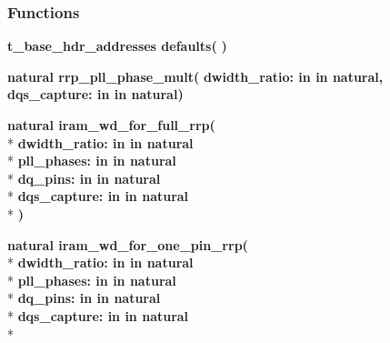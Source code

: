 \subsubsection*{Functions}
 \begin{DoxyCompactItemize}
\item 
{\bfseries {\bfseries {\bfseries {\bf t\+\_\+base\+\_\+hdr\+\_\+addresses}} \textcolor{vhdlchar}{ }}} {\bf defaults}{\bfseries  ( }{\bfseries  )} 
\item 
{\bfseries {\bfseries \textcolor{comment}{natural}\textcolor{vhdlchar}{ }}} {\bf rrp\+\_\+pll\+\_\+phase\+\_\+mult}{\bfseries  ( }{\bfseries \textcolor{vhdlchar}{dwidth\+\_\+ratio\+: }\textcolor{stringliteral}{in }\textcolor{vhdlchar}{in natural}}{\bfseries  , \textcolor{vhdlchar}{dqs\+\_\+capture\+: }\textcolor{stringliteral}{in }\textcolor{vhdlchar}{in natural}}{\bfseries  )} 
\item 
{\bfseries {\bfseries \textcolor{comment}{natural}\textcolor{vhdlchar}{ }}} {\bf iram\+\_\+wd\+\_\+for\+\_\+full\+\_\+rrp}{\bfseries  ( }\\*
{\bfseries \textcolor{vhdlchar}{dwidth\+\_\+ratio\+: }\textcolor{stringliteral}{in }\textcolor{vhdlchar}{in natural}}\\*
{\bfseries \textcolor{vhdlchar}{pll\+\_\+phases\+: }\textcolor{stringliteral}{in }\textcolor{vhdlchar}{in natural}}\\*
{\bfseries \textcolor{vhdlchar}{dq\+\_\+pins\+: }\textcolor{stringliteral}{in }\textcolor{vhdlchar}{in natural}}\\*
{\bfseries \textcolor{vhdlchar}{dqs\+\_\+capture\+: }\textcolor{stringliteral}{in }\textcolor{vhdlchar}{in natural}}\\*
{\bfseries  )} 
\item 
{\bfseries {\bfseries \textcolor{comment}{natural}\textcolor{vhdlchar}{ }}} {\bf iram\+\_\+wd\+\_\+for\+\_\+one\+\_\+pin\+\_\+rrp}{\bfseries  ( }\\*
{\bfseries \textcolor{vhdlchar}{dwidth\+\_\+ratio\+: }\textcolor{stringliteral}{in }\textcolor{vhdlchar}{in natural}}\\*
{\bfseries \textcolor{vhdlchar}{pll\+\_\+phases\+: }\textcolor{stringliteral}{in }\textcolor{vhdlchar}{in natural}}\\*
{\bfseries \textcolor{vhdlchar}{dq\+\_\+pins\+: }\textcolor{stringliteral}{in }\textcolor{vhdlchar}{in natural}}\\*
{\bfseries \textcolor{vhdlchar}{dqs\+\_\+capture\+: }\textcolor{stringliteral}{in }\textcolor{vhdlchar}{in natural}}\\*

\end{DoxyCompactItemize}
